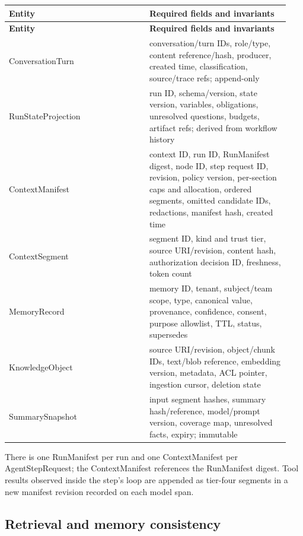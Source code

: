\BookTableStart
\small
\begin{longtable}{@{}Y{0.4700\linewidth}Y{0.4700\linewidth}@{}}
\color{white}\bfseries \textbf{Entity} & \color{white}\bfseries \textbf{Required fields and invariants} \\
\endfirsthead
{}
\color{white}\bfseries \textbf{Entity} & \color{white}\bfseries \textbf{Required fields and invariants} \\
\endhead
ConversationTurn & conversation/turn IDs, role/type, content reference/hash, producer, created time, classification, source/trace refs; append-only \\
RunStateProjection & run ID, schema/version, state version, variables, obligations, unresolved questions, budgets, artifact refs; derived from workflow history \\
ContextManifest & context ID, run ID, RunManifest digest, node ID, step request ID, revision, policy version, per-section caps and allocation, ordered segments, omitted candidate IDs, redactions, manifest hash, created time \\
ContextSegment & segment ID, kind and trust tier, source URI/revision, content hash, authorization decision ID, freshness, token count \\
MemoryRecord & memory ID, tenant, subject/team scope, type, canonical value, provenance, confidence, consent, purpose allowlist, TTL, status, supersedes \\
KnowledgeObject & source URI/revision, object/chunk IDs, text/blob reference, embedding version, metadata, ACL pointer, ingestion cursor, deletion state \\
SummarySnapshot & input segment hashes, summary hash/reference, model/prompt version, coverage map, unresolved facts, expiry; immutable \\
\end{longtable}
\BookTableEnd

There is one RunManifest per run and one ContextManifest per AgentStepRequest; the ContextManifest references the RunManifest digest. Tool results observed inside the step's loop are appended as tier-four segments in a new manifest revision recorded on each model span.\par

\subsection{Retrieval and memory consistency}

